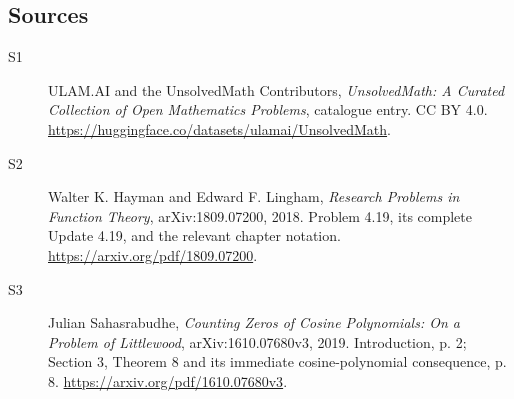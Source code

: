 \documentclass[11pt]{book}
\begin{document}
\subsection{Sources}
\begin{description}
\item[\hypertarget{source:statement:1}{S1}] ULAM.AI and the UnsolvedMath Contributors, \emph{UnsolvedMath: A Curated Collection of Open Mathematics Problems}, catalogue entry. CC BY 4.0. \url{https://huggingface.co/datasets/ulamai/UnsolvedMath}.
\item[\hypertarget{source:statement:2}{S2}] Walter K. Hayman and Edward F. Lingham, \emph{Research Problems in Function Theory}, arXiv:1809.07200, 2018. Problem 4.19, its complete Update 4.19, and the relevant chapter notation. \url{https://arxiv.org/pdf/1809.07200}.
\item[\hypertarget{source:statement:3}{S3}] Julian Sahasrabudhe, \emph{Counting Zeros of Cosine Polynomials: On a Problem of Littlewood}, arXiv:1610.07680v3, 2019. Introduction, p. 2; Section 3, Theorem 8 and its immediate cosine-polynomial consequence, p. 8. \url{https://arxiv.org/pdf/1610.07680v3}.
\end{description}
\label{end:statement}
\end{document}
